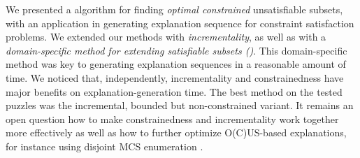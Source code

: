 We presented a \hitsetbased algorithm for finding \textit{optimal constrained} unsatisfiable subsets, with an application in generating explanation sequence for constraint satisfaction problems.
We extended our methods with \emph{incrementality}, as well as with a \emph{domain-specific method for extending satisfiable subsets (\grow)}. 
This domain-specific \grow method was key to generating explanation sequences in a reasonable amount of time.
We noticed that, independently, incrementality and constrainedness have major benefits on explanation-generation time. The best method on the tested puzzles was the incremental, bounded but non-constrained variant. 
It remains an open question how to make constrainedness and incrementality work together more effectively
as well as how to further optimize O(C)US-based explanations, for instance using disjoint MCS enumeration \cite{marques2020reasoning}.



